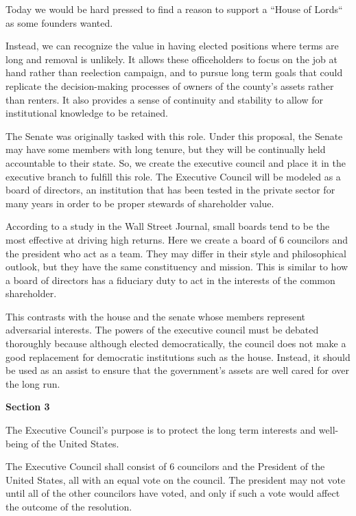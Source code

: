 \documentclass{article}
\begin{document}
Today we would be hard pressed to find a reason to support a “House of Lords“ as some founders wanted.

Instead, we can recognize the value in having elected positions where terms are long and removal is unlikely. It allows these officeholders to focus on the job at hand rather than reelection campaign, and to pursue long term goals that could replicate the decision-making processes of owners of the county's assets rather than renters. It also provides a sense of continuity and stability to allow for institutional knowledge to be retained.

The Senate was originally tasked with this role. Under this proposal, the Senate may have some members with long tenure, but they will be continually held accountable to their state. So, we create the executive council and place it in the executive branch to fulfill this role. The Executive Council will be modeled as a board of directors, an institution that has been tested in the private sector for many years in order to be proper stewards of shareholder value.

According to a study in the Wall Street Journal, small boards tend to be the most effective at driving high returns\cite{Lublin}. Here we create a board of 6 councilors and the president who act as a team. They may differ in their style and philosophical outlook, but they have the same constituency and mission. This is similar to how a board of directors has a fiduciary duty to act in the interests of the common shareholder.

This contrasts with the house and the senate whose members represent adversarial interests. The powers of the executive council must be debated thoroughly because although elected democratically, the council does not make a good replacement for democratic institutions such as the house. Instead, it should be used as an assist to ensure that the government's assets are well cared for over the long run.

\begin{quoting}
\textbf{Section 3}

The Executive Council’s purpose is to protect the long term interests and well-being of the United States.

The Executive Council shall consist of 6 councilors and the President of the United States, all with an equal vote on the council. The president may not vote until all of the other councilors have voted, and only if such a vote would affect the outcome of the resolution.
\end{quoting}
\end{document}
